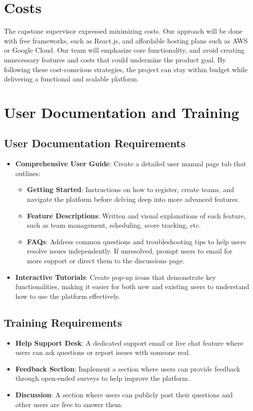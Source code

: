 \documentclass[12pt]{article}
\begin{document}
\section{Costs}
The capstone supervisor expressed minimizing costs. Our approach will be done with free frameworks, such as React.js, and affordable hosting plans such as AWS or Google Cloud. Our team will emphasize core functionality, and avoid creating unnecessary features and costs that could undermine the product goal. By following these cost-conscious strategies, the project can stay within budget while delivering a functional and scalable platform.

\section{User Documentation and Training}
\subsection{User Documentation Requirements}
\begin{itemize}
    \item \textbf{Comprehensive User Guide}: Create a detailed user manual page tab that outlines:
    \begin{itemize}
        \item \textbf{Getting Started}: Instructions on how to register, create teams, and navigate the platform before delving deep into more advanced features.
        \item \textbf{Feature Descriptions}: Written and visual explanations of each feature, such as team management, scheduling, score tracking, etc.
        \item \textbf{FAQs}: Address common questions and troubleshooting tips to help users resolve issues independently. If unresolved, prompt users to email for more support or direct them to the discussions page.
    \end{itemize}
    \item \textbf{Interactive Tutorials}: Create pop-up icons that demonstrate key functionalities, making it easier for both new and existing users to understand how to use the platform effectively.
\end{itemize}

\subsection{Training Requirements}
\begin{itemize}
    \item \textbf{Help Support Desk}: A dedicated support email or live chat feature where users can ask questions or report issues with someone real.
    \item \textbf{Feedback Section}: Implement a section where users can provide feedback through open-ended surveys to help improve the platform.
    \item \textbf{Discussion}: A section where users can publicly post their questions and other users are free to answer them.
\end{itemize}
\end{document}
